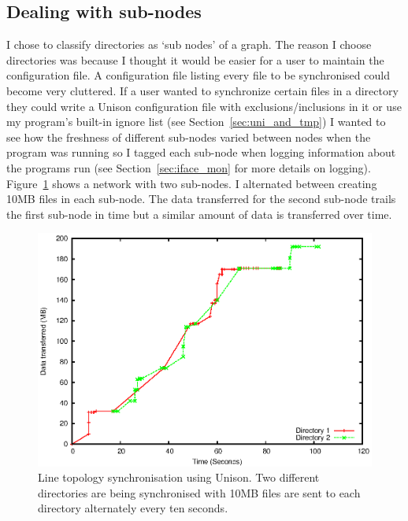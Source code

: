 \documentclass[12pt]{article}
\begin{document}
\subsection{Dealing with sub-nodes}
\label{sec:subnodes}
I chose to classify directories as `sub nodes' of a graph. 
The reason I choose directories was because I thought it
would be easier for a user to maintain the configuration file.
A configuration file listing every file to be synchronised could
become very cluttered.
If a user wanted to synchronize
certain files in a directory they could write a Unison configuration file with 
exclusions/inclusions in it or use my program's built-in ignore
list (see Section~\ref{sec:uni_and_tmp})
I wanted to see how the freshness of different
sub-nodes varied between nodes when the program was running so I tagged
each sub-node when logging information about the programs run 
(see Section~\ref{sec:iface_mon} for more
details on logging). Figure~\ref{fig:line_uni_2dir_comb_graph}
shows a network with two sub-nodes. I alternated between creating
10MB files in each sub-node. The data transferred for the second
sub-node trails the first sub-node in time but a similar amount
of data is transferred over time.

\begin{figure}[htp]
    \centering
    \includegraphics[width=1\textwidth]{images/line-uni-dir-comb.eps}
    \caption{Line topology synchronisation using Unison. Two different directories are being synchronised with 10MB files are sent to each directory alternately every
    ten seconds.}
    \label{fig:line_uni_2dir_comb_graph}
\end{figure}
\newpage
\end{document}
